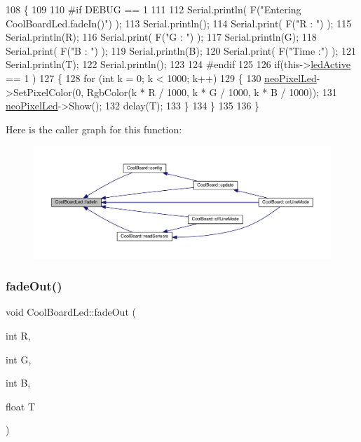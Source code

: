 \begin{DoxyCode}
108 \{
109 
110 \textcolor{preprocessor}{#if DEBUG == 1}
111 
112     Serial.println( F(\textcolor{stringliteral}{"Entering CoolBoardLed.fadeIn()"}) );
113     Serial.println();
114     Serial.print( F(\textcolor{stringliteral}{"R : "}) );
115     Serial.println(R);
116     Serial.print( F(\textcolor{stringliteral}{"G : "}) );
117     Serial.println(G);
118     Serial.print( F(\textcolor{stringliteral}{"B : "}) );
119     Serial.println(B);
120     Serial.print( F(\textcolor{stringliteral}{"Time :"}) );
121     Serial.println(T);
122     Serial.println();
123 
124 \textcolor{preprocessor}{#endif  }
125     
126     \textcolor{keywordflow}{if}(this->\hyperlink{classCoolBoardLed_a5f17c135516fcf4b44ea8a096ba0177a}{ledActive} == 1 )
127     \{
128         \textcolor{keywordflow}{for} (\textcolor{keywordtype}{int} k = 0; k < 1000; k++) 
129         \{
130             \hyperlink{classCoolBoardLed_ac2c13fa462a010cd9242bf297c013923}{neoPixelLed}->SetPixelColor(0, RgbColor(k * R / 1000, k * G / 1000, k * B / 1000));
131             \hyperlink{classCoolBoardLed_ac2c13fa462a010cd9242bf297c013923}{neoPixelLed}->Show();
132             delay(T);
133         \}
134     \}
135 
136 \}
\end{DoxyCode}
Here is the caller graph for this function\+:
\nopagebreak
\begin{figure}[H]
\begin{center}
\leavevmode
\includegraphics[width=350pt]{classCoolBoardLed_ab778f5e7bed0ab74e3906d82110493c3_icgraph}
\end{center}
\end{figure}
\mbox{\label{classCoolBoardLed_a93d545679237e8cc858324367149775c}} 
\subsubsection{\texorpdfstring{fade\+Out()}{fadeOut()}}
{\footnotesize\ttfamily void Cool\+Board\+Led\+::fade\+Out (\begin{DoxyParamCaption}\item[{int}]{R,  }\item[{int}]{G,  }\item[{int}]{B,  }\item[{float}]{T }\end{DoxyParamCaption})}

